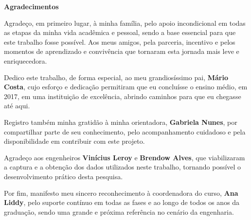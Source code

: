 
\begin{center}
\huge{{\bf Agradecimentos}}
\vspace{4cm}
\end{center}

Agradeço, em primeiro lugar, à minha família, pelo apoio incondicional em todas as etapas da minha vida acadêmica e pessoal, sendo a base essencial para que este trabalho fosse possível. Aos meus amigos, pela parceria, incentivo e pelos momentos de aprendizado e convivência que tornaram esta jornada mais leve e enriquecedora.

Dedico este trabalho, de forma especial, ao meu grandiosíssimo pai, \textbf{Mário Costa}, cujo esforço e dedicação permitiram que eu concluísse o ensino médio, em 2017, em uma instituição de excelência, abrindo caminhos para que eu chegasse até aqui.

Registro também minha gratidão à minha orientadora, \textbf{Gabriela Nunes}, por compartilhar parte de seu conhecimento, pelo acompanhamento cuidadoso e pela disponibilidade em contribuir com este projeto.  

Agradeço aos engenheiros \textbf{Vinícius Leroy} e \textbf{Brendow Alves}, que viabilizaram a captura e a obtenção dos dados utilizados neste trabalho, tornando possível o desenvolvimento prático desta pesquisa.  

Por fim, manifesto meu sincero reconhecimento à coordenadora do curso, \textbf{Ana Liddy}, pelo suporte contínuo em todas as fases e ao longo de todos os anos da graduação, sendo uma grande e próxima referência no cenário da engenharia.
